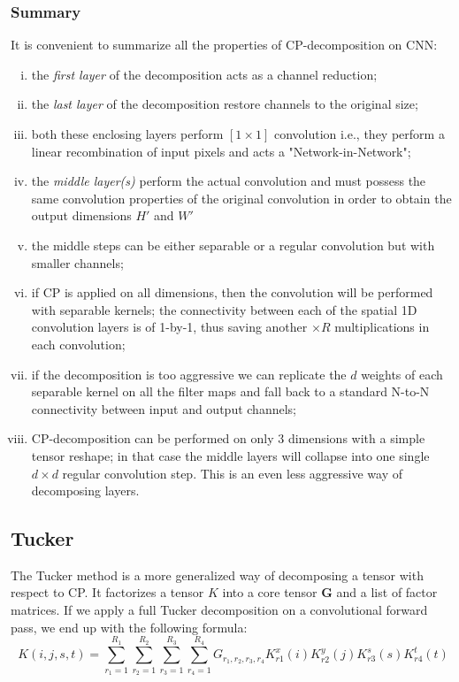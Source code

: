 \pagebreak
\subsubsection{Summary}
\label{subsec:cp-summary}
It is convenient to summarize all the properties of CP-decomposition on CNN: 
\begin{enumerate}[(i)]
	\item the \emph{first layer} of the decomposition acts as a channel reduction;
	
	\item the \emph{last layer} of the decomposition restore channels to the original size; 
	
	\item both these enclosing layers perform $[1 \times 1]$ convolution i.e., they perform a linear recombination of input pixels and acts a "Network-in-Network";
	
	\item the \emph{middle layer(s)} perform the actual convolution and must possess the same convolution properties of the original convolution in order to obtain the output dimensions $H'$ and $W'$
	
	\item the middle steps can be either separable or a regular convolution but with smaller channels; 
	
	\item if CP is applied on all dimensions, then the convolution will be performed with separable kernels; the connectivity between each of the spatial 1D convolution layers is of 1-by-1, thus saving another $\times R$ multiplications in each convolution; 
	
	\item if the decomposition is too aggressive we can replicate the $d$ weights of each separable kernel on all the filter maps and fall back to a standard N-to-N connectivity between input and output channels; 
	
	\item CP-decomposition can be performed on only 3 dimensions with a simple tensor reshape; in that case the middle layers will collapse into one single $d \times d$ regular convolution step. This is an even less aggressive way of decomposing layers. 
 
\end{enumerate}

\subsection{Tucker}
The Tucker method is a more generalized way of decomposing a tensor with respect to CP. It factorizes a tensor $K$ into a core tensor $\mathbf{G}$ and a list of factor matrices. If we apply a full Tucker decomposition on a convolutional forward pass, we end up with the following formula: 
\begin{equation}
   K(i, j, s, t) = \sum_{r_1=1}^{R_1}\sum_{r_2=1}^{R_2}\sum_{r_3=1}^{R_3}\sum_{r_4=1}^{R_4}G_{r_1, r_2, r_3, r_4}  K^x_{r1}(i)K^y_{r2}(j)K^s_{r3}(s)K^t_{r4}(t) 
\end{equation}

